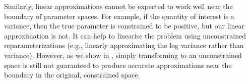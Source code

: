 Similarly, linear approximations cannot be expected to work well near the
boundary of parameter spaces.  For example, if the quantity of interest is a
variance, then the true parameter is constrained to be positive, but our linear
approximation is not. It can help to linearise the problem using unconstrained
reparameterizations (e.g., linearly approximating the log variance rather than
variance).  However, as we show in ,
simply transforming to an unconstrained space is still not guaranteed to produce
accurate approximations near the boundary in the original, constrained space.
